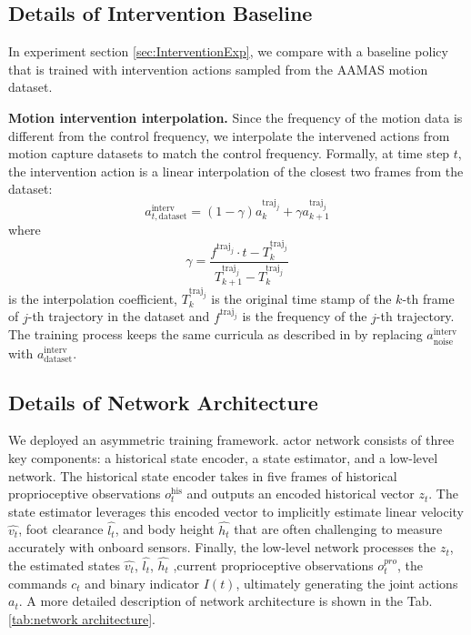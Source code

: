 

\subsection{Details of Intervention Baseline}
In experiment section \ref{sec:InterventionExp}, we compare \our with a baseline policy that is trained with intervention actions sampled from the AAMAS motion dataset.

\noindent\textbf{Motion intervention interpolation.}
Since the frequency of the motion data is different from the control frequency, we interpolate the intervened actions from motion capture datasets to match the control frequency. Formally, at time step $t$, the intervention action is a linear interpolation of the closest two frames from the dataset:
\begin{equation}
    a^{\text{interv}}_{t, \text{dataset}} = (1-\gamma) a_k^{\text{traj}_j} + \gamma a_{k+1}^{\text{traj}_j}
\end{equation}
where 
$$
    \gamma = \frac{f^{\text{traj}_j}\cdot t-T_k^{\text{traj}_j}}{T_{k+1}^{\text{traj}_j}-T_{k}^{\text{traj}_j}}
$$
is the interpolation coefficient,
$T_k^{\text{traj}_j}$ is the original time stamp of the $k$-th frame of $j$-th trajectory in the dataset and $f^{\text{traj}_j}$ is the frequency of the $j$-th trajectory.
The training process keeps the same curricula as described in  by replacing $a^{\text{interv}}_{\text{noise}}$ with $a^{\text{interv}}_{\text{dataset}}$.

\subsection{Details of Network Architecture}
We deployed an asymmetric training framework. 
\our actor network consists of three key components: a historical state encoder, a state estimator, and a low-level network. The historical state encoder takes in five frames of historical proprioceptive observations $o_t^{\text{his}}$ and outputs an encoded historical vector $z_t$. The state estimator leverages this encoded vector to implicitly estimate linear velocity $\hat{v_t}$, foot clearance $\hat{l_t}$, and body height $\hat{h_t}$ that are often challenging to measure accurately with onboard sensors. Finally, the low-level network processes the $z_t$, the estimated states $\hat{v_t}$, $\hat{l_t}$, $\hat{h_t}$ ,current proprioceptive observations $o_t^{pro}$, the commands $c_t$ and binary indicator $I(t)$, ultimately generating the joint actions $a_t$. A more detailed description of network architecture is shown in the Tab. \ref{tab:network architecture}.

